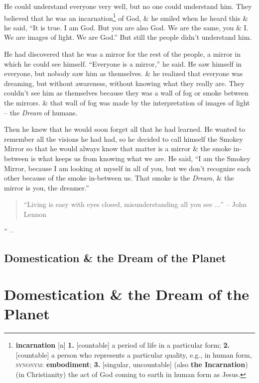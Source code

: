 \documentclass[oneside]{book}
\numberwithin{equation}{section}
\begin{document}
He could understand everyone very well, but no one could understand him. They believed that he was an incarnation\footnote{\textbf{incarnation} [n] \textbf{1.} [countable] a period of life in a particular form; \textbf{2.} [countable] a person who represents a particular quality, e.g., in human form, \textsc{synonym}: \textbf{embodiment}; \textbf{3.} [singular, uncountable] (also \textbf{the Incarnation}) (in Christianity) the act of God coming to earth in human form as Jesus.} of God, \& he smiled when he heard this \& he said, ``It is true. I am God. But you are also God. We are the same, you \& I. We are images of light. We are God.'' But still the people didn't understand him.

He had discovered that he was a mirror for the rest of the people, a mirror in which he could see himself. ``Everyone is a mirror,'' he said. He saw himself in everyone, but nobody saw him as themselves. \& he realized that everyone was dreaming, but without awareness, without knowing what they really are. They couldn't see him as themselves because they was a wall of fog or smoke between the mirrors. \& that wall of fog was made by the interpretation of images of light -- the \textit{Dream} of humans.

Then he knew that he would soon forget all that he had learned. He wanted to remember all the visions he had had, so he decided to call himself the Smokey Mirror so that he would always know that matter is a mirror \& the smoke in-between is what keeps us from knowing what we are. He said, ``I am the Smokey Mirror, because I am looking at myself in all of you, but we don't recognize each other because of the smoke in-between us. That smoke is the \textit{Dream}, \& the mirror is you, the dreamer.''
\begin{quotation}
	``Living is easy with eyes closed, misunderstanding all you see $\ldots$'' -- John Lennon
\end{quotation}
'' -- \cite[Introduction\texttt{/}The Smokey Mirror]{Ruiz2011}

\subsection*{Domestication \& the Dream of the Planet}

\section{Domestication \& the Dream of the Planet}
\end{document}

